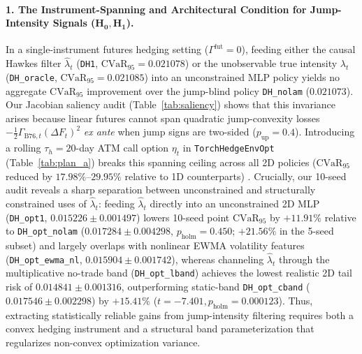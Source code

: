 \documentclass[11pt,a4paper]{article}
\begin{document}
\paragraph{1. The Instrument-Spanning and Architectural Condition for Jump-Intensity Signals ($\mathbf{H_0, H_1}$).}
In a single-instrument futures hedging setting ($\Gamma^{\text{fut}} = 0$), feeding either the causal Hawkes filter $\hat{\lambda}_t$ (\texttt{DH1}, $\text{CVaR}_{95} = 0.021078$) or the unobservable true intensity $\lambda_t$ (\texttt{DH\_oracle}, $\text{CVaR}_{95} = 0.021085$) into an unconstrained MLP policy yields no aggregate $\text{CVaR}_{95}$ improvement over the jump-blind policy \texttt{DH\_nolam} ($0.021073$). Our Jacobian saliency audit (Table~\ref{tab:saliency}) shows that this invariance arises because linear futures cannot span quadratic jump-convexity losses $-\frac{1}{2}\Gamma_{\text{B76},t}(\Delta F_t)^2$ \emph{ex ante} when jump signs are two-sided ($p_{\text{up}} = 0.4$). Introducing a rolling $\tau_h = 20$-day ATM call option $\eta_t$ in \texttt{TorchHedgeEnvOpt} (Table~\ref{tab:plan_a}) breaks this spanning ceiling across all 2D policies ($\text{CVaR}_{95}$ reduced by $17.98\%\text{--}29.95\%$ relative to 1D counterparts) \citep{CarbonneauGodin2024}. Crucially, our 10-seed audit reveals a sharp separation between unconstrained and structurally constrained uses of $\hat{\lambda}_t$: feeding $\hat{\lambda}_t$ directly into an unconstrained 2D MLP (\texttt{DH\_opt1}, $0.015226 \pm 0.001497$) lowers 10-seed point $\text{CVaR}_{95}$ by $+11.91\%$ relative to \texttt{DH\_opt\_nolam} ($0.017284 \pm 0.004298$, $p_{\text{holm}} = 0.450$; $+21.56\%$ in the 5-seed subset) and largely overlaps with nonlinear EWMA volatility features (\texttt{DH\_opt\_ewma\_nl}, $0.015904 \pm 0.001742$), whereas channeling $\hat{\lambda}_t$ through the multiplicative no-trade band (\texttt{DH\_opt\_lband}) achieves the lowest realistic 2D tail risk of $0.014841 \pm 0.001316$, outperforming static-band \texttt{DH\_opt\_cband} ($0.017546 \pm 0.002298$) by $+15.41\%$ ($t = -7.401, p_{\text{holm}} = 0.000123$). Thus, extracting statistically reliable gains from jump-intensity filtering requires both a convex hedging instrument and a structural band parameterization that regularizes non-convex optimization variance.
\end{document}
